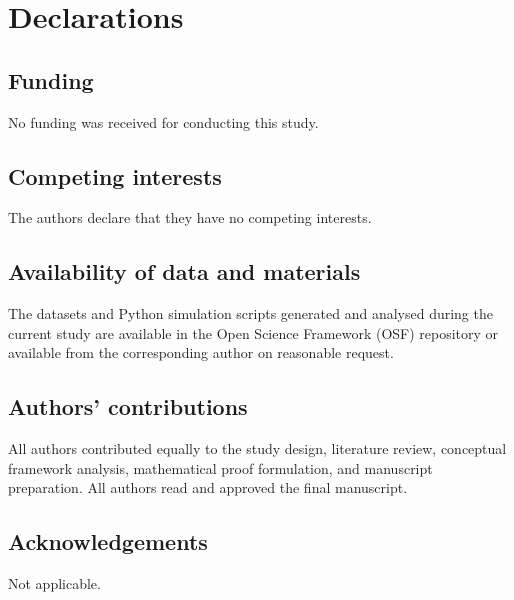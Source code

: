 \documentclass[11pt,a4paper]{article}
\begin{document}
\section*{Declarations}

\subsection*{Funding}
No funding was received for conducting this study.

\subsection*{Competing interests}
The authors declare that they have no competing interests.

\subsection*{Availability of data and materials}
The datasets and Python simulation scripts generated and analysed during the current study are available in the Open Science Framework (OSF) repository or available from the corresponding author on reasonable request.

\subsection*{Authors' contributions}
All authors contributed equally to the study design, literature review, conceptual framework analysis, mathematical proof formulation, and manuscript preparation. All authors read and approved the final manuscript.

\subsection*{Acknowledgements}
Not applicable.
\end{document}
